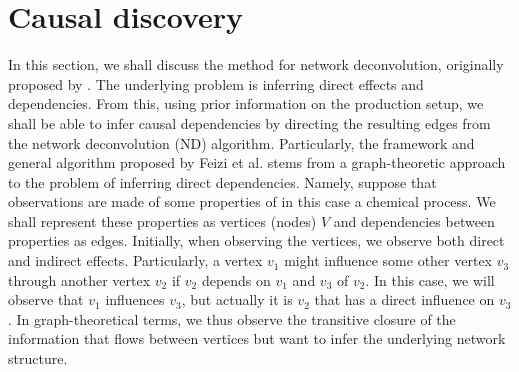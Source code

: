 \documentclass[../Thesis.tex]{subfiles}
\begin{document}
\section{Causal discovery}
In this section, we shall discuss the method for network deconvolution, originally proposed by \cite{Network-deconvolution-as-a-general-method-to-distinguish-direct-dependencies-in-networks}. The underlying problem is inferring direct effects and dependencies. From this, using prior information on the production setup, we shall be able to infer causal dependencies by directing the resulting edges from the network deconvolution (ND) algorithm. Particularly, the framework and general algorithm proposed by Feizi et al. stems from a graph-theoretic approach to the problem of inferring direct dependencies. Namely, suppose that observations are made of some properties of in this case a chemical process. We shall represent these properties as vertices (nodes) $V$ and dependencies between properties as edges. Initially, when observing the vertices, we observe both direct and indirect effects. Particularly, a vertex $v_1$ might influence some other vertex $v_3$ through another vertex $v_2$ if $v_2$ depends on $v_1$ and $v_3$ of $v_2$. In this case, we will observe that $v_1$ influences $v_3$, but actually it is $v_2$ that has a direct influence on $v_3$. In graph-theoretical terms, we thus observe the transitive closure of the information that flows between vertices but want to infer the underlying network structure.
\end{document}
